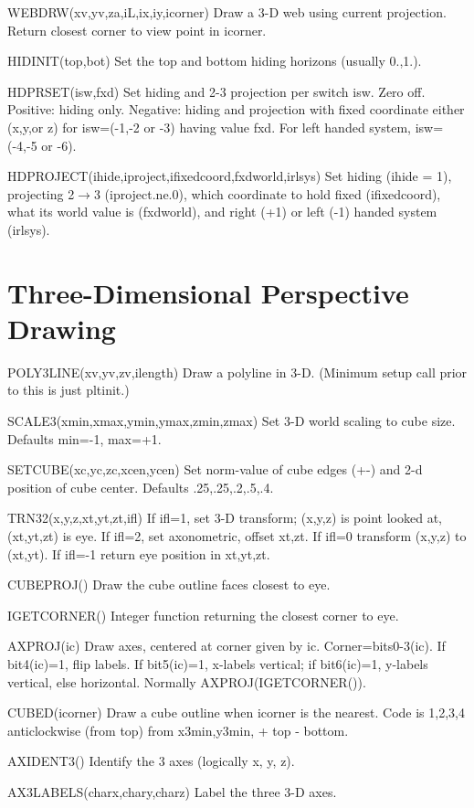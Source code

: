 \documentclass[12pt]{article}
\begin{document}
WEBDRW(xv,yv,za,iL,ix,iy,icorner) Draw  a 3-D web using current projection.
Return closest corner to view point in icorner.

HIDINIT(top,bot) Set the top and bottom hiding horizons (usually 0.,1.).

HDPRSET(isw,fxd) Set hiding and 2-3 projection per switch isw. Zero
off.  Positive: hiding only. Negative: hiding and projection with
fixed coordinate either (x,y,or z) for isw=(-1,-2 or -3) having value
fxd. For left handed system, isw=(-4,-5 or -6).

HDPROJECT(ihide,iproject,ifixedcoord,fxdworld,irlsys)
Set hiding (ihide = 1), projecting 2$\rightarrow$3 (iproject.ne.0), which
coordinate to hold fixed (ifixedcoord), what its world value is
(fxdworld), and right (+1) or left (-1) handed system (irlsys).

\section{Three-Dimensional Perspective Drawing}

POLY3LINE(xv,yv,zv,ilength) Draw a polyline in 3-D. (Minimum setup
call prior to this is just pltinit.)

SCALE3(xmin,xmax,ymin,ymax,zmin,zmax) Set 3-D world scaling to cube
size. Defaults min=-1, max=+1.

SETCUBE(xc,yc,zc,xcen,ycen) Set norm-value of cube edges (+-) and 2-d 
position of cube center. Defaults .25,.25,.2,.5,.4.

TRN32(x,y,z,xt,yt,zt,ifl) If ifl=1, set 3-D transform; (x,y,z) is
point looked at, (xt,yt,zt) is eye. If ifl=2, set axonometric, offset
xt,zt.  If ifl=0 transform (x,y,z) to (xt,yt). If ifl=-1 return eye 
position in xt,yt,zt.

CUBEPROJ() Draw the cube outline faces closest to eye.

IGETCORNER() Integer function returning the closest corner to eye.

AXPROJ(ic) Draw axes, centered at corner given by ic.
Corner=bits0-3(ic). If bit4(ic)=1, flip labels.  If bit5(ic)=1,
x-labels vertical; if bit6(ic)=1, y-labels vertical, else horizontal.
Normally AXPROJ(IGETCORNER()).

CUBED(icorner) Draw a cube outline when icorner is the nearest.
Code is 1,2,3,4 anticlockwise (from top) from x3min,y3min, + top - bottom.

AXIDENT3() Identify the 3 axes (logically x, y, z).

AX3LABELS(charx,chary,charz) Label the three 3-D axes.
\end{document}

